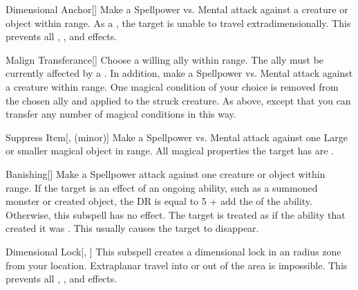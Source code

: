 \begin{ability}[\nth{2}]{Dimensional Anchor}[]
Make a Spellpower vs. Mental attack against a creature or object within \rngmed range.
\hit As a , the target is unable to travel extradimensionally.
This prevents all , , and  effects.
\end{ability}
\vspace{0.25em}


\begin{ability}[\nth{2}]{Malign Transferance}[]
Choose a willing ally within \rngmed range.
The ally must be currently affected by a  .
In addition, make a Spellpower vs. Mental attack against a creature within \rngmed range.
\hit One magical condition of your choice is removed from the chosen ally and applied to the struck creature.
\crit As above, except that you can transfer any number of magical conditions in this way.
\end{ability}
\vspace{0.25em}


\begin{ability}[\nth{2}]{Suppress Item}[,  (minor)]
Make a Spellpower vs. Mental attack against one Large or smaller magical object in \rngmed range.
\hit All magical properties the target has are .
\end{ability}
\vspace{0.25em}


\begin{ability}[\nth{3}]{Banishing}[]
Make a Spellpower attack against one creature or object within \rngmed range.
If the target is an effect of an ongoing  ability, such as a summoned monster or created object, the DR is equal to 5 + add the  of the ability.
Otherwise, this subspell has no effect.
\hit The target is treated as if the ability that created it was .
This usually causes the target to disappear.
\end{ability}
\vspace{0.25em}


\begin{ability}[\nth{5}]{Dimensional Lock}[, ]
This subspell creates a dimensional lock in an \arealarge radius zone from your location.
Extraplanar travel into or out of the area is impossible.
This prevents all , , and  effects.
\end{ability}
\vspace{0.25em}


